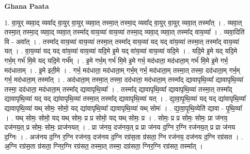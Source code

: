 \documentclass[17pt]{extarticle}
\begin{document}
\textbf{Ghana Paata } \newline

1. वा॒युर् व्यवा॒द् व्यवा᳚द् वा॒युर् वा॒युर् व्यवा॒त् तस्मा॒त् तस्मा॒द् व्यवा᳚द् वा॒युर् वा॒युर् व्यवा॒त् तस्मा᳚त् । . व्यवा॒त् तस्मा॒त् तस्मा॒द् व्यवा॒द् व्यवा॒त् तस्मा᳚द् वाय॒व्या॑ वाय॒व्या॑ तस्मा॒द् व्यवा॒द् व्यवा॒त् तस्मा᳚द् वाय॒व्या᳚ । . व्यवा॒दिति॑ वि - अवा᳚त् । . तस्मा᳚द् वाय॒व्या॑ वाय॒व्या॑ तस्मा॒त् तस्मा᳚द् वाय॒व्या॑ यद् यद् वा॑य॒व्या॑ तस्मा॒त् तस्मा᳚द् वाय॒व्या॑ यत् । . वा॒य॒व्या॑ यद् यद् वा॑य॒व्या॑ वाय॒व्या॑ यदि॒मे इ॒मे यद् वा॑य॒व्या॑ वाय॒व्या॑ यदि॒मे । . यदि॒मे इ॒मे यद् यदि॒मे गर्भ॒म् गर्भ॑ मि॒मे यद् यदि॒मे गर्भ᳚म् । . इ॒मे गर्भ॒म् गर्भ॑ मि॒मे इ॒मे गर्भ॒ मद॑धाता॒ मद॑धाता॒म् गर्भ॑ मि॒मे इ॒मे गर्भ॒ मद॑धाताम् । . इ॒मे इती॒मे । . गर्भ॒ मद॑धाता॒ मद॑धाता॒म् गर्भ॒म् गर्भ॒ मद॑धाता॒म् तस्मा॒त् तस्मा॒ दद॑धाता॒म् गर्भ॒म् गर्भ॒ मद॑धाता॒म् तस्मा᳚त् । . अद॑धाता॒म् तस्मा॒त् तस्मा॒ दद॑धाता॒ मद॑धाता॒म् तस्मा᳚द् द्यावापृथि॒व्या᳚ द्यावापृथि॒व्या॑ तस्मा॒ दद॑धाता॒ मद॑धाता॒म् तस्मा᳚द् द्यावापृथि॒व्या᳚ । . तस्मा᳚द् द्यावापृथि॒व्या᳚ द्यावापृथि॒व्या॑ तस्मा॒त् तस्मा᳚द् द्यावापृथि॒व्या॑ यद् यद् द्या॑वापृथि॒व्या॑ तस्मा॒त् तस्मा᳚द् द्यावापृथि॒व्या॑ यत् । . द्या॒वा॒पृ॒थि॒व्या॑ यद् यद् द्या॑वापृथि॒व्या᳚ द्यावापृथि॒व्या॑ यथ् सोमः॒ सोमो॒ यद् द्या॑वापृथि॒व्या᳚ द्यावापृथि॒व्या॑ यथ् सोमः॑ । . द्या॒वा॒पृ॒थि॒व्येति॑ द्यावा - पृ॒थि॒व्या᳚ । . यथ् सोमः॒ सोमो॒ यद् यथ् सोमः॒ प्र प्र सोमो॒ यद् यथ् सोमः॒ प्र । . सोमः॒ प्र प्र सोमः॒ सोमः॒ प्रा ज॑नय॒ दज॑नय॒त् प्र सोमः॒ सोमः॒ प्राज॑नयत् । . प्रा ज॑नय॒ दज॑नय॒त् प्र प्रा ज॑नय द॒ग्नि र॒ग्नि रज॑नय॒त् प्र प्रा ज॑नय द॒ग्निः । . अज॑नय द॒ग्नि र॒ग्नि रज॑नय॒ दज॑नय द॒ग्नि रग्र॑स॒ता ग्र॑सता॒ ग्नि रज॑नय॒ दज॑नय द॒ग्नि रग्र॑सत । . अ॒ग्नि रग्र॑स॒ता ग्र॑सता॒ ग्निर॒ग्नि रग्र॑सत॒ तस्मा॒त् तस्मा॒ दग्र॑सता॒ ग्निर॒ग्नि रग्र॑सत॒ तस्मा᳚त् । \newline
\end{document}
